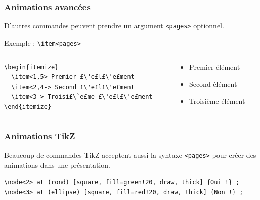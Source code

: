 \begin{frame}[fragile]
  \frametitle{Animations avancées}

D'autres commandes peuvent prendre un argument \lstinline?<pages>? optionnel.

\bigskip
Exemple : \lstinline?\item<pages>?
\begin{columns}
  \begin{column}{0.40\textwidth}
\begin{lstlisting}
\begin{itemize}
  \item<1,5> Premier £\'e£l£\'e£ment
  \item<2,4-> Second £\'e£l£\'e£ment
  \item<3-> Troisi£\`e£me £\'e£l£\'e£ment
\end{itemize}\end{lstlisting}
  \end{column}
  \begin{column}{0.40\textwidth}
\rmfamily
\begin{itemize}
  \item<1,5> Premier élément
  \item<2,4-> Second élément
  \item<3-> Troisième élément
\end{itemize}
  \end{column}
\end{columns}

\pause[5]
\end{frame}



\begin{frame}[fragile, t]
  \frametitle{Animations TikZ}

\begin{figure}
\end{figure}

\bigskip
Beaucoup de commandes TikZ acceptent aussi la syntaxe \lstinline?<pages>? pour créer des animations dans une présentation.

\bigskip
\begin{lstlisting}
\node<2> at (rond) [square, fill=green!20, draw, thick] {Oui !} ;
\node<3> at (ellipse) [square, fill=red!20, draw, thick] {Non !} ;
\end{lstlisting}
\end{frame}



